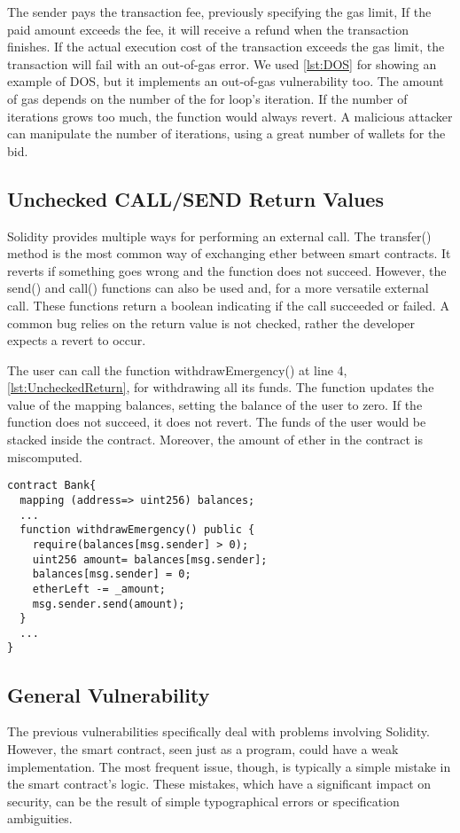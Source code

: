 \documentclass[a4paper,sigconf, language=french,
language=german, language=spanish, language=english]{acmart}
\begin{document}
The sender pays the transaction fee, previously specifying the gas limit, If the paid amount exceeds the fee, it will receive a refund when the transaction finishes. 
If the actual execution cost of the transaction exceeds the gas limit, the transaction will fail with an out-of-gas error. 
We used \autoref{lst:DOS} for showing an example of DOS, but it implements an out-of-gas vulnerability too. 
The amount of gas depends on the number of the for loop's iteration. If the number of iterations grows too much, the function would always revert. A malicious attacker can 
manipulate the number of iterations, using a great number of wallets for the bid.

\subsection{Unchecked CALL/SEND Return Values} 
Solidity provides multiple ways for performing an external call. 
The transfer() method is the most common way of exchanging ether between smart contracts. 
It reverts if something goes wrong and the function does not succeed. However, the send() and call() functions can also be used and, for a more versatile external call. 
These functions return a boolean indicating if the call succeeded or failed.  A common bug relies on the return value is not checked, rather the developer expects a revert to occur. 

The user can call the function withdrawEmergency()  at line 4, \autoref{lst:UncheckedReturn}, for withdrawing all its funds. The function updates the value of the mapping balances, setting 
the balance of the user to zero. If the function does not succeed, it does not revert. 
The funds of the user would be stacked inside the contract. Moreover, the amount of ether in the contract is miscomputed.

\begin{lstlisting}[language=Solidity,caption={Unchecked CALL/SEND Return Values},label={lst:UncheckedReturn}]
contract Bank{
  mapping (address=> uint256) balances;
  ... 
  function withdrawEmergency() public {
    require(balances[msg.sender] > 0);
    uint256 amount= balances[msg.sender];
    balances[msg.sender] = 0;
    etherLeft -= _amount;
    msg.sender.send(amount);
  }
  ...
}

\end{lstlisting}

\subsection{General Vulnerability}
The previous vulnerabilities specifically deal with problems involving Solidity. However, the smart contract, seen just as a 
program, could have a weak implementation.
The most frequent issue, though, is typically a simple mistake in the smart contract's logic.
These mistakes, which have a significant impact on security, can be the result of simple typographical errors or specification ambiguities. 
\end{document}
